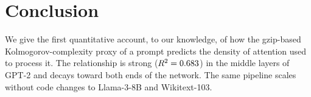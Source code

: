 \section{Conclusion}
We give the first quantitative account, to our knowledge, of how the
gzip-based Kolmogorov-complexity proxy of a prompt predicts the
density of attention used to process it. The relationship is strong
($R^2 = 0.683$) in the middle layers of GPT-2 and decays
toward both ends of the network. The same pipeline scales without
code changes to Llama-3-8B and Wikitext-103.
